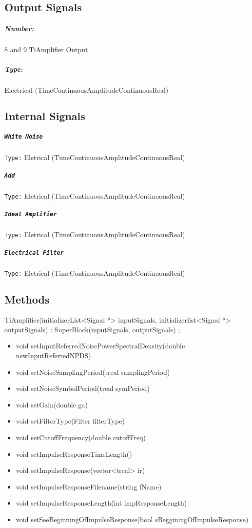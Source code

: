 \subsection*{Output Signals}
\subparagraph*{Number:} 8 and 9 Ti\textunderscore Amplifier Output
\subparagraph*{Type:} Electrical (TimeContinuousAmplitudeContinuousReal)
\subsection*{Internal Signals}
\subparagraph*{\texttt{White Noise}}
\texttt{Type:} Eletrical (TimeContinuousAmplitudeContinuousReal)
\subparagraph*{\texttt{Add}}
\texttt{Type:} Eletrical (TimeContinuousAmplitudeContinuousReal)
\subparagraph*{\texttt{Ideal Amplifier}}
\texttt{Type:} Eletrical (TimeContinuousAmplitudeContinuousReal)
\subparagraph*{\texttt{Electrical Filter}}
\texttt{Type:} Eletrical (TimeContinuousAmplitudeContinuousReal)

\subsection*{Methods}
TiAmplifier(initializer\textunderscore List<Signal *> inputSignals, initializer\textunderscore list<Signal *> outputSignals) : SuperBlock(inputSignals, outputSignals) {};
\bigbreak
\begin{itemize}
    \item void setInputReferredNoisePowerSpectralDensity(double newInputReferredNPDS)
    \item void setNoiseSamplingPeriod(t\textunderscore real samplingPeriod)
    \item void setNoiseSymbolPeriod(t\textunderscore real symPeriod)
    \item void setGain(double ga)
    \item void setFilterType(Filter filterType)
    \item void setCutoffFrequency(double cutoffFreq)
    \item void setImpulseResponseTimeLength()
    \item void setImpulseResponse(vector<t\textunderscore real> ir)
    \item void setImpulseResponseFilename(string fName)
    \item void setImpulseResponseLength(int impResponseLength)
    \item void setSeeBeginningOfImpulseResponse(bool sBegginingOfImpulseResponse)
\end{itemize}


